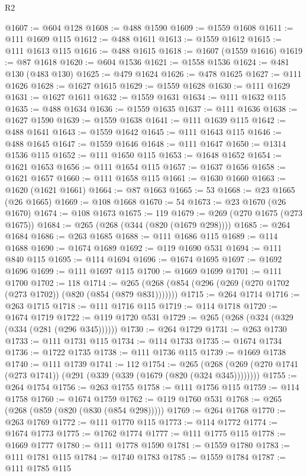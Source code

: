 \begin{lexlean}{R2}
\begin{coremodule}
@1607 := @604 @128
@1608 := @488 @1590
@1609 := @1559 @1608
@1611 := @111 @1609 @115
@1612 := @488 @1611
@1613 := @1559 @1612
@1615 := @111 @1613 @115
@1616 := @488 @1615
@1618 := @1607 (@1559 @1616)
@1619 := @87 @1618
@1620 := @604 @1536
@1621 := @1558 @1536
@1624 := @481 @130 (@483 @130)
@1625 := @479 @1624
@1626 := @478 @1625
@1627 := @111 @1626
@1628 := @1627 @1615
@1629 := @1559 @1628
@1630 := @111 @1629
@1631 := @1627 @1611
@1632 := @1559 @1631
@1634 := @111 @1632 @115
@1635 := @488 @1634
@1636 := @1559 @1635
@1637 := @111 @1636
@1638 := @1627 @1590
@1639 := @1559 @1638
@1641 := @111 @1639 @115
@1642 := @488 @1641
@1643 := @1559 @1642
@1645 := @111 @1643 @115
@1646 := @488 @1645
@1647 := @1559 @1646
@1648 := @111 @1647
@1650 := @1314 @1536 @115
@1652 := @111 @1650 @115
@1653 := @1648 @1652
@1654 := @1621 @1653
@1656 := @111 @1654 @115
@1657 := @1637 @1656
@1658 := @1621 @1657
@1660 := @111 @1658 @115
@1661 := @1630 @1660
@1663 := @1620 (@1621 @1661)
@1664 := @87 @1663
@1665 := 53
@1668 := @23 @1665 (@26 @1665)
@1669 := @108 @1668
@1670 := 54
@1673 := @23 @1670 (@26 @1670)
@1674 := @108 @1673
@1675 := 119
@1679 := @269 (@270 @1675 (@273 @1675))
@1684 := @265 (@268 (@344 (@820 (@1679 @298))))
@1685 := @264 @1684
@1686 := @263 @1685
@1688 := @111 @1686 @115
@1689 := @114 @1688
@1690 := @1674 @1689
@1692 := @119 @1690 @531
@1694 := @111 @840 @115
@1695 := @114 @1694
@1696 := @1674 @1695
@1697 := @1692 @1696
@1699 := @111 @1697 @115
@1700 := @1669 @1699
@1701 := @111 @1700
@1702 := 118
@1714 := @265 (@268 (@854 (@296 (@269 (@270 @1702 (@273 @1702)) (@820 (@854 (@879 @831)))))))
@1715 := @264 @1714
@1716 := @263 @1715
@1718 := @111 @1716 @115
@1719 := @114 @1718
@1720 := @1674 @1719
@1722 := @119 @1720 @531
@1729 := @265 (@268 (@324 (@329 (@334 (@281 (@296 @345))))))
@1730 := @264 @1729
@1731 := @263 @1730
@1733 := @111 @1731 @115
@1734 := @114 @1733
@1735 := @1674 @1734
@1736 := @1722 @1735
@1738 := @111 @1736 @115
@1739 := @1669 @1738
@1740 := @111 @1739
@1741 := 112
@1754 := @265
    (@268 (@269 (@270 @1741 (@273 @1741)) (@291 (@339 (@339 (@1679 (@820 (@324 @345))))))))
@1755 := @264 @1754
@1756 := @263 @1755
@1758 := @111 @1756 @115
@1759 := @114 @1758
@1760 := @1674 @1759
@1762 := @119 @1760 @531
@1768 := @265 (@268 (@859 (@820 (@830 (@854 @298)))))
@1769 := @264 @1768
@1770 := @263 @1769
@1772 := @111 @1770 @115
@1773 := @114 @1772
@1774 := @1674 @1773
@1775 := @1762 @1774
@1777 := @111 @1775 @115
@1778 := @1669 @1777
@1780 := @111 @1778 @1590
@1781 := @1559 @1780
@1783 := @111 @1781 @115
@1784 := @1740 @1783
@1785 := @1559 @1784
@1787 := @111 @1785 @115

\end{coremodule}
\end{lexlean}
